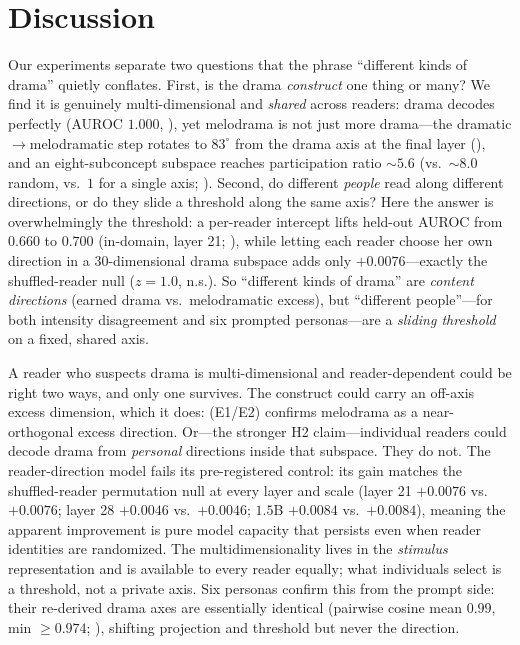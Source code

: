 \section{Discussion}\label{sec:discussion}

 Our experiments separate two questions that the phrase ``different kinds of drama'' quietly conflates. First, is the drama \emph{construct} one thing or many? We find it is genuinely multi-dimensional and \emph{shared} across readers: drama decodes perfectly (AUROC $1.000$, ), yet melodrama is not just more drama---the dramatic$\to$melodramatic step rotates to $83^\circ$ from the drama axis at the final layer (), and an eight-subconcept subspace reaches participation ratio $\sim$$5.6$ (vs.\ $\sim$$8.0$ random, vs.\ $1$ for a single axis; ). Second, do different \emph{people} read along different directions, or do they slide a threshold along the same axis? Here the answer is overwhelmingly the threshold: a per-reader intercept lifts held-out AUROC from $0.660$ to $0.700$ (in-domain, layer 21; ), while letting each reader choose her own direction in a $30$-dimensional drama subspace adds only $+0.0076$---exactly the shuffled-reader null ($z\!=\!1.0$, n.s.). So ``different kinds of drama'' are \emph{content directions} (earned drama vs.\ melodramatic excess), but ``different people''---for both \goemotions{} intensity disagreement and six prompted personas---are a \emph{sliding threshold} on a fixed, shared axis.

 A reader who suspects drama is multi-dimensional and reader-dependent could be right two ways, and only one survives. The construct could carry an off-axis excess dimension, which it does:  (E1/E2) confirms melodrama as a near-orthogonal excess direction. Or---the stronger H2 claim---individual readers could decode drama from \emph{personal} directions inside that subspace. They do not. The reader-direction model fails its pre-registered control: its gain matches the shuffled-reader permutation null at every layer and scale (layer 21 $+0.0076$ vs.\ $+0.0076$; layer 28 $+0.0046$ vs.\ $+0.0046$; $1.5$B $+0.0084$ vs.\ $+0.0084$), meaning the apparent improvement is pure model capacity that persists even when reader identities are randomized. The multidimensionality lives in the \emph{stimulus} representation and is available to every reader equally; what individuals select is a threshold, not a private axis. Six personas confirm this from the prompt side: their re-derived drama axes are essentially identical (pairwise cosine mean $0.99$, min $\geq0.974$; ), shifting projection and threshold but never the direction.

